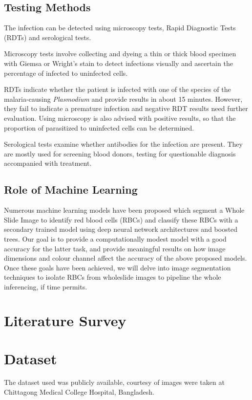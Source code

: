 \documentclass[10pt,twocolumn,letterpaper]{article}
\begin{document}
\subsection{Testing Methods}
The infection can be detected using microscopy tests, Rapid Diagnostic Tests (RDTs) and serological tests.\cite{cdcmalaria}

Microscopy tests involve collecting and dyeing a thin or thick blood specimen with Giemsa or Wright's stain to detect infections visually and ascertain the percentage of infected to uninfected cells.

RDTs indicate whether the patient is infected with one of the species of the malaria-causing \textit{Plasmodium} and provide results in about 15 minutes. However, they fail to indicate a premature infection and negative RDT results need further evaluation. Using microscopy is also advised with positive results, so that the proportion of parasitized to uninfected cells can be determined.

Serological tests examine whether antibodies for the infection are present. They are mostly used for screening blood donors, testing for questionable diagnosis accompanied with treatment.

\subsection{Role of Machine Learning}
Numerous machine learning models have been proposed which segment a Whole Slide Image to identify red blood cells (RBCs) and classify these RBCs with a secondary trained model using deep neural network architectures and boosted trees. Our goal is to provide a computationally modest model with a good accuracy for the latter task, and provide meaningful results on how image dimensions and colour channel affect the accuracy of the above proposed models. Once these goals have been achieved, we will delve into image segmentation techniques to isolate RBCs from wholeslide images to pipeline the whole inferencing, if time permits.

\section{Literature Survey}

\section{Dataset}
The dataset used was publicly available, courtesy of  images were taken at Chittagong Medical College Hospital, Bangladesh.\cite{datasetref}
\end{document}
